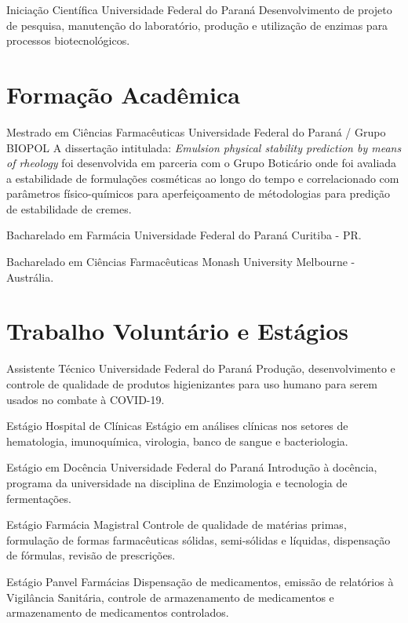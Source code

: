 {Iniciação Científica}
{Universidade Federal do Paraná}
{
	Desenvolvimento de projeto de pesquisa, 
	manutenção do laboratório, 
	produção e utilização de enzimas para processos biotecnológicos.
}

\section{Formação Acadêmica}

{Mestrado em Ciências Farmacêuticas}
{Universidade Federal do Paraná / Grupo BIOPOL}
{
	A dissertação intitulada: \emph{Emulsion physical stability prediction by means of rheology}
	foi desenvolvida em parceria com o Grupo Boticário onde foi avaliada a estabilidade
	de formulações cosméticas ao longo do tempo e correlacionado com parâmetros 
	físico-químicos para aperfeiçoamento de métodologias para predição de estabilidade de cremes.
}

{Bacharelado em Farmácia}
{Universidade Federal do Paraná}
{Curitiba - PR.}

{Bacharelado em Ciências Farmacêuticas}
{Monash University}
{Melbourne - Austrália.}

\section{Trabalho Voluntário e Estágios}

{Assistente Técnico}
{Universidade Federal do Paraná}
{
	Produção, desenvolvimento e controle de qualidade de produtos higienizantes 
	para uso humano para serem usados no combate à COVID-19.
}

{Estágio}
{Hospital de Clínicas}
{Estágio em análises clínicas nos setores de hematologia, 
imunoquímica, virologia, banco de sangue e bacteriologia.}

{Estágio em Docência}
{Universidade Federal do Paraná}
{Introdução à docência, programa da universidade 
na disciplina de Enzimologia e tecnologia de fermentações.}

{Estágio}
{Farmácia Magistral}
{Controle de qualidade de matérias primas, 
formulação de formas farmacêuticas sólidas, 
semi-sólidas e líquidas, dispensação de fórmulas, 
revisão de prescrições.}

{Estágio}
{Panvel Farmácias}
{Dispensação de medicamentos, 
emissão de relatórios à Vigilância Sanitária, 
controle de armazenamento de medicamentos e 
armazenamento de medicamentos controlados.}

